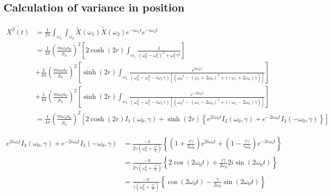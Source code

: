 \documentclass[12pt, twoside]{article}
\begin{document}
\subsection{Calculation of variance in position}
$\begin{aligned} \overline{X ^ { 2 } ( t )} &= \frac { 1 } { 2 \pi } \int _ { \omega _ { 1 }}\int_{\omega_2} \overline{\widetilde { X } ( \omega_1 )\widetilde { X } ( \omega_2 )}  e ^ { - i \omega _ { 1 } t } e ^ { - i \omega _ { 2 } t } \\ &= \frac{1}{4\pi}\left(\frac { m \omega _ { 0 } a_0 } { p _ { 0 } }\right)^2 \left[ 2 \cosh(2r) \int_{\omega_1} \frac{1}{(\omega_0^2 - \omega_1 ^2)^2 + \omega_1 ^2 \gamma^2}\right] \\&+ \frac{1}{4\pi}\left(\frac { m \omega _ { 0 } a_0 } { p _ { 0 } }\right)^2 \left[ \sinh(2r) \int_{\omega_1} \frac{e^{2i\omega_0 t}}{(\omega_0^2 - \omega_1 ^2 - i\omega_1\gamma) [({\omega_0}^2 - (\omega_1 + 2\omega_0)^2 + i(\omega_1 + 2 \omega_0) \gamma)]}\right]
\\&+ \frac{1}{4\pi}\left(\frac { m \omega _ { 0 } a_0 } { p _ { 0 } }\right)^2 \left[ \sinh(2r) \int_{\omega_1} \frac{e^{-2i\omega_0 t}}{(\omega_0^2 - \omega_1 ^2 - i\omega_1\gamma) [({\omega_0}^2 - (\omega_1 - 2\omega_0)^2 + i(\omega_1 - 2 \omega_0) \gamma)]}\right] \\ & = \frac{1}{4\pi}\left(\frac { m \omega _ { 0 } a_0 } { p _ { 0 } }\right)^2 \left[ 2 \cosh(2r) I_1(\omega_0,\gamma) + \sinh(2r) \left\{e^{2i\omega_0 t}I_3(\omega_0,\gamma) + e^{-2i\omega_0 t}I_3(-\omega_0,\gamma)\right\}\right]
\end{aligned}$

$\begin{aligned}e^{2i\omega_0 t}I_3(\omega_0,\gamma) + e^{-2i\omega_0 t}I_3(-\omega_0,\gamma) & = \frac{-\pi}{2\gamma(\omega_0^2 + \frac{\gamma^2}{4})}\left\{\left( 1 + \frac { i \gamma } { 2 \omega _ { 0 } } \right) e ^ { 2 i \omega _ { 0 } t } + \left( 1 - \frac { i \gamma } { \gamma \omega _ { 0 } } \right) e ^ { - 2 i \omega _ { 0 } t }\right\} \\ & = \frac{-\pi}{2\gamma(\omega_0^2 + \frac{\gamma^2}{4})} \left\{2\cos(2\omega_0 t) + \frac{i\gamma}{2 \omega_0} 2 i \sin(2\omega_0 t)\right\} \\&= \frac{-\pi}{\gamma(\omega_0^2 + \frac{\gamma^2}{4})} \left\{\cos(2\omega_0 t) - \frac{\gamma}{2 \omega_0} \sin(2\omega_0 t)\right\}  \end{aligned}$
\end{document}
